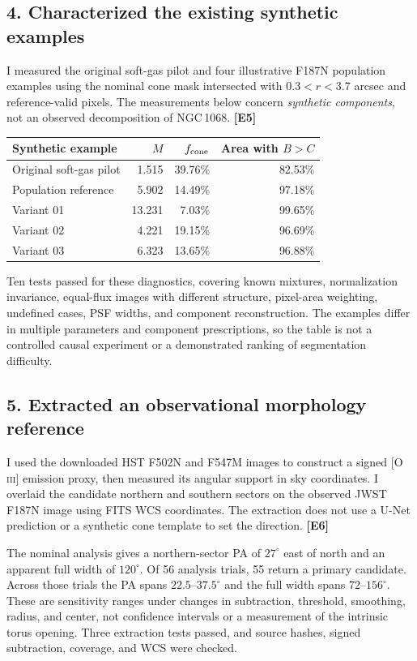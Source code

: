 \documentclass[10pt,letterpaper]{article}
\newcommand{\ev}[1]{\textcolor{ink}{\textbf{[#1]}}}
\newcommand{\oiii}{[O\,\textsc{iii}]}
\begin{document}
\clearpage
\subsection*{4. Characterized the existing synthetic examples}
I measured the original soft-gas pilot and four illustrative F187N population examples using the
nominal cone mask intersected with $0.3<r<3.7$ arcsec and reference-valid pixels. The measurements
below concern \emph{synthetic components}, not an observed decomposition of NGC\,1068. \ev{E5}

\begin{center}
\renewcommand{\arraystretch}{1.15}
\begin{tabular}{lrrr}
\toprule
\textbf{Synthetic example} & \textbf{$M$} & \textbf{$f_{\rm cone}$} & \textbf{Area with $B>C$}\\
\midrule
Original soft-gas pilot & 1.515 & 39.76\% & 82.53\%\\
Population reference & 5.902 & 14.49\% & 97.18\%\\
Variant 01 & 13.231 & 7.03\% & 99.65\%\\
Variant 02 & 4.221 & 19.15\% & 96.69\%\\
Variant 03 & 6.323 & 13.65\% & 96.88\%\\
\bottomrule
\end{tabular}
\end{center}

Ten tests passed for these diagnostics, covering known mixtures, normalization invariance, equal-flux
images with different structure, pixel-area weighting, undefined cases, PSF widths, and component
reconstruction. The examples differ in multiple parameters and component prescriptions, so the
table is not a controlled causal experiment or a demonstrated ranking of segmentation difficulty.

\subsection*{5. Extracted an observational morphology reference}
I used the downloaded HST F502N and F547M images to construct a signed \oiii{} emission proxy, then
measured its angular support in sky coordinates. I overlaid the candidate northern and southern
sectors on the observed JWST F187N image using FITS WCS coordinates. The extraction does not use a
U-Net prediction or a synthetic cone template to set the direction. \ev{E6}

The nominal analysis gives a northern-sector PA of $27^\circ$ east of north and an apparent full width
of $120^\circ$. Of 56 analysis trials, 55 return a primary candidate. Across those trials the PA spans
$22.5$--$37.5^\circ$ and the full width spans $72$--$156^\circ$. These are sensitivity ranges under
changes in subtraction, threshold, smoothing, radius, and center, not confidence intervals or a
measurement of the intrinsic torus opening. Three extraction tests passed, and source hashes,
signed subtraction, coverage, and WCS were checked.
\end{document}
